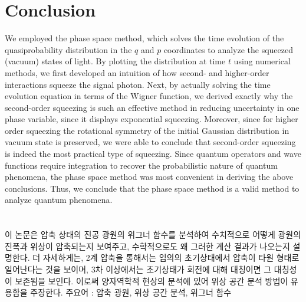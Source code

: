 \documentclass[10pt,a4paper]{report}
\def\paperkeywords{압축 광원, 위상 공간 분석, 위그너 함수} %
\begin{document}
\chapter{Conclusion}\label{chap:conclusion}

We employed the phase space method, which solves the time evolution of the quasiprobability distribution in the $q$ and $p$ coordinates to analyze the squeezed (vacuum) states of light.
By plotting the distribution at time $t$ using numerical methods, we first developed an intuition of how second- and higher-order interactions squeeze the signal photon.
Next, by actually solving the time evolution equation in terms of the Wigner function, we derived exactly why the second-order squeezing is such an effective method in reducing uncertainty in one phase variable, since it displays exponential squeezing.
Moreover, since for higher order squeezing the rotational symmetry of the initial Gaussian distribution in vacuum state is preserved, we were able to conclude that second-order squeezing is indeed the most practical type of squeezing.
Since quantum operators and wave functions require integration to recover the probabilistic nature of quantum phenomena, the phase space method was most convenient in deriving the above conclusions.
Thus, we conclude that the phase space method is a valid method to analyze quantum phenomena.

\printbibliography

\chapter*{\abstractname} %

이 논문은 압축 상태의 진공 광원의 위그너 함수를 분석하여 수치적으로 어떻게 광원의 진폭과 위상이 압축되는지 보여주고, 수학적으로도 왜 그러한 계산 결과가 나오는지 설명한다. 더 자세하게는, 2계 압축을 통해서는 임의의 초기상태에서 압축이 타원 형태로 일어난다는 것을 보이며, 3차 이상에서는 초기상태가 회전에 대해 대칭이면 그 대칭성이 보존됨을 보인다. 이로써 양자역학적 현상의 분석에 있어 위상 공간 분석 방법이 유용함을 주장한다.
\vfill
주요어 : \paperkeywords
\end{document}
